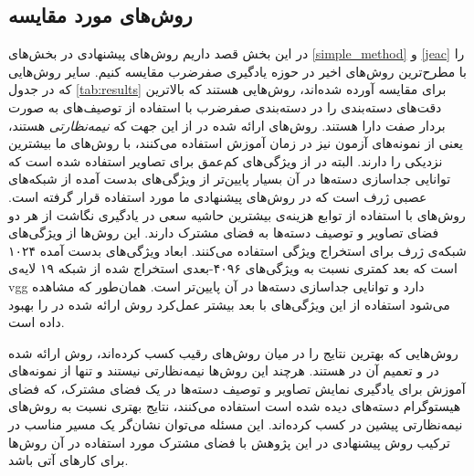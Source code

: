 \subsection{روش‌های مورد مقایسه}\label{exp:other_methods}
در این بخش قصد داریم روش‌های پیشنهادی در بخش‌های \ref{simple_method} و \ref{jeac} را با مطرح‌ترین روش‌های اخیر در حوزه یادگیری صفرضرب مقایسه کنیم.
سایر روش‌هایی که در جدول  \ref{tab:results} برای مقایسه آورده شده‌اند، روش‌هایی هستند که بالاترین دقت‌های دسته‌بندی را در دسته‌بندی صفرضرب با استفاده از توصیف‌های به صورت بردار صفت دارا هستند.
روش‌های ارائه شده در
\cite{li15max, semi15, Kodirov2015}
از این جهت که \textit{نیمه‌نظارتی} هستند، یعنی از  نمونه‌های آزمون نیز در زمان آموزش استفاده می‌کنند، با روش‌های ما بیشترین نزدیکی را دارند. البته در
\cite{li15max, semi15}
از ویژگی‌های کم‌عمق برای تصاویر استفاده شده است که توانایی جداسازی دسته‌ها در آن بسیار پایین‌تر از ویژگی‌های بدست آمده از شبکه‌های عصبی ژرف است که در روش‌های پیشنهادی ما مورد استفاده قرار گرفته است. روش‌های
\cite{Akata2015, Xian2016}
با استفاده از توابع هزینه‌ی بیشترین حاشیه سعی در یادگیری نگاشت از هر دو فضای تصاویر و توصیف دسته‌ها به فضای مشترک دارند. این روش‌ها از ویژگی‌های شبکه‌ی ژرف
 \cite{googlenet}
 برای استخراج ویژگی استفاده می‌کنند. ابعاد ویژگی‌های بدست آمده ۱۰۲۴ است که بعد کمتری نسبت به ویژگی‌های ۴۰۹۶-بعدی استخراج شده از شبکه ۱۹ لایه‌ی vgg دارد و توانایی جداسازی دسته‌ها در آن پایین‌تر است. همان‌طور که مشاهده می‌شود استفاده از این ویژگی‌های با بعد بیشتر عمل‌کرد روش ارائه شده در \cite{Akata2015} را بهبود داده است.

 روش‌هایی که بهترین نتایج را در میان روش‌های رقیب کسب کرده‌اند، روش ارائه شده در \cite{sse} و تعمیم آن در \cite{agnostic}  هستند. هرچند این روش‌ها نیمه‌نظارتی نیستند و تنها از نمونه‌های آموزش برای یادگیری نمایش تصاویر و توصیف دسته‌ها در یک فضای مشترک، که فضای هیستوگرام دسته‌های دیده شده است استفاده می‌کنند، نتایج بهتری نسبت به روش‌های نیمه‌نظارتی پیشین در \cite{li15max, semi15, Kodirov2015} کسب کرده‌اند. این مسئله می‌توان نشان‌گر یک مسیر مناسب در ترکیب روش پیشنهادی در این پژوهش با فضای مشترک مورد استفاده در آن روش‌ها برای کارهای آتی باشد.

